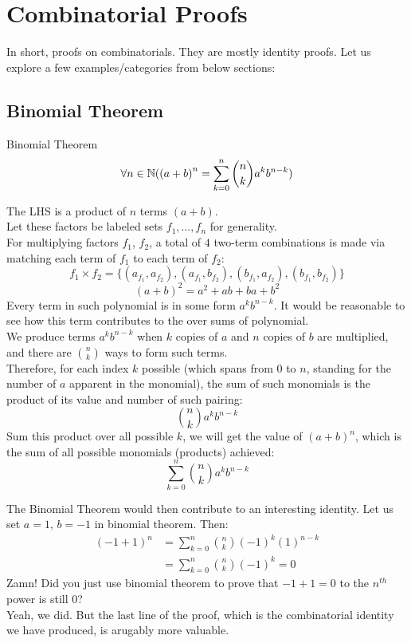 \section{Combinatorial Proofs}
In short, proofs on combinatorials. They are mostly identity proofs. Let us explore a few examples/categories from below sections:

\subsection{Binomial Theorem}
\begin{ln-theorem}{Binomial Theorem}{}
    \[\forall n \in \mathbb{N} ({(a + b)}^n = \sum_{k = 0}^n \binom{n}{k} a^k b^{n - k})\]
\end{ln-theorem}

The LHS is a product of $n$ terms $(a + b)$. \\
Let these factors be labeled sets $f_1, \dots, f_n$ for generality. \\
For multiplying factors $f_1$, $f_2$, a total of $4$ two-term combinations is made via matching each term of $f_1$ to each term of $f_2$:
\[f_1 \times f_2 = \{(a_{f_1}, a_{f_2}), (a_{f_1}, b_{f_2}), (b_{f_1}, a_{f_2}), (b_{f_1}, b_{f_2})\}\]
\[(a + b)^2 = a^2 + ab + ba + b^2\]
Every term in such polynomial is in some form $a^k b^{n - k}$. It would be reasonable to see how this term contributes to the over sums of polynomial. \\
We produce terms $a^k b^{n - k}$ when $k$ copies of $a$ and $n$ copies of $b$ are multiplied, and there are $\binom{n}{k}$ ways to form such terms. \\
Therefore, for each index $k$ possible (which spans from $0$ to $n$, standing for the number of $a$ apparent in the monomial), the sum of such monomials is the product of its value and number of such pairing:
\[\binom{n}{k} a^k b^{n - k}\]
Sum this product over all possible $k$, we will get the value of ${(a + b)}^n$, which is the sum of all possible monomials (products) achieved:
\[\sum_{k = 0}^n \binom{n}{k} a^k b^{n - k}\]

The Binomial Theorem would then contribute to an interesting identity. Let us set $a = 1$, $b = -1$ in binomial theorem. Then:
\begin{align*}
    (-1 + 1)^n
    &= \sum_{k = 0}^n \binom{n}{k} {(-1)}^k {(1)}^{n - k} \\
    &= \sum_{k = 0}^n \binom{n}{k} {(-1)}^k = 0
\end{align*}
Zamn! Did you just use binomial theorem to prove that $-1 + 1 = 0$ to the $n^{th}$ power is still $0$? \\
Yeah, we did. But the last line of the proof, which is the combinatorial identity we have produced, is arugably more valuable.

